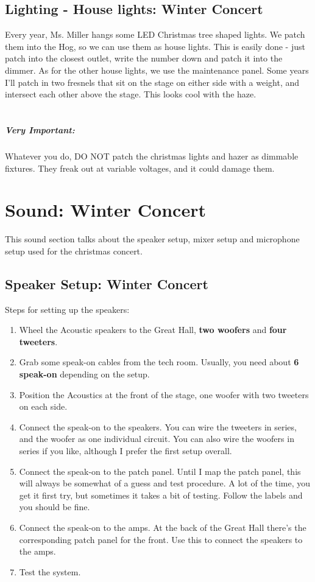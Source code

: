 \documentclass[11pt,a4paper]{book}
\begin{document}
\subsection{Lighting - House lights: Winter Concert}
Every year, Ms. Miller hangs some LED Christmas tree shaped lights. We patch them into the Hog, so we can use them as house lights. This is easily done - just patch into the closest outlet, write the number down and patch it into the dimmer. As for the other house lights, we use the maintenance panel. Some years I'll patch in two fresnels that sit on the stage on either side with a weight, and intersect each other above the stage. This looks cool with the haze.\\\\
\subparagraph{Very Important:} Whatever you do, DO NOT patch the christmas lights and hazer as dimmable fixtures. They freak out at variable voltages, and it could damage them.  

\section{Sound: Winter Concert}
This sound section talks about the speaker setup, mixer setup and microphone setup used for the christmas concert.

\subsection{Speaker Setup: Winter Concert}

Steps for setting up the speakers:
\begin{enumerate}
\item Wheel the Acoustic speakers to the Great Hall, \textbf{two woofers} and \textbf{four tweeters}.
\item Grab some speak-on cables from the tech room. Usually, you need about \textbf{6 speak-on} depending on the setup.
\item Position the Acoustics at the front of the stage, one woofer with two tweeters on each side.
\item Connect the speak-on to the speakers. You can wire the tweeters in series, and the woofer as one individual circuit. You can also wire the woofers in series if you like, although I prefer the first setup overall.
\item Connect the speak-on to the patch panel. Until I map the patch panel, this will always be somewhat of a guess and test procedure. A lot of the time, you get it first try, but sometimes it takes a bit of testing. Follow the labels and you should be fine.
\item Connect the speak-on to the amps. At the back of the Great Hall there's the corresponding patch panel for the front. Use this to connect the speakers to the amps.
\item Test the system.
\end{enumerate} 
\end{document}
